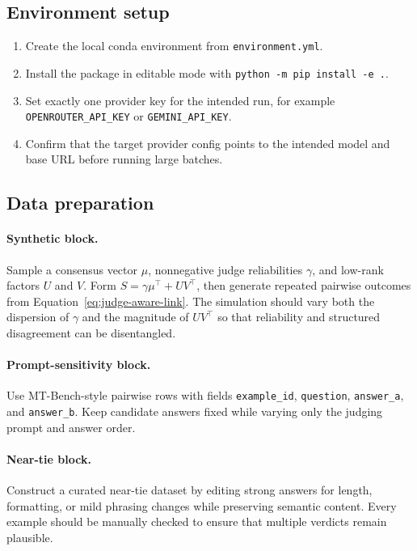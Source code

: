 \documentclass{article}
\begin{document}
\begin{bibunit}[unsrtnat]
\subsection{Environment setup}

\begin{enumerate}[leftmargin=1.5em]
  \item Create the local conda environment from \texttt{environment.yml}.
  \item Install the package in editable mode with \texttt{python -m pip install -e .}.
  \item Set exactly one provider key for the intended run, for example \texttt{OPENROUTER\_API\_KEY} or \texttt{GEMINI\_API\_KEY}.
  \item Confirm that the target provider config points to the intended model and base URL before running large batches.
\end{enumerate}

\subsection{Data preparation}

\paragraph{Synthetic block.}
Sample a consensus vector $\mu$, nonnegative judge reliabilities $\gamma$, and low-rank factors $U$ and $V$. Form $S = \gamma \mu^\top + UV^\top$, then generate repeated pairwise outcomes from Equation~\eqref{eq:judge-aware-link}. The simulation should vary both the dispersion of $\gamma$ and the magnitude of $UV^\top$ so that reliability and structured disagreement can be disentangled.

\paragraph{Prompt-sensitivity block.}
Use MT-Bench-style pairwise rows with fields \texttt{example\_id}, \texttt{question}, \texttt{answer\_a}, and \texttt{answer\_b}. Keep candidate answers fixed while varying only the judging prompt and answer order.

\paragraph{Near-tie block.}
Construct a curated near-tie dataset by editing strong answers for length, formatting, or mild phrasing changes while preserving semantic content. Every example should be manually checked to ensure that multiple verdicts remain plausible.


\end{bibunit}
\end{document}
